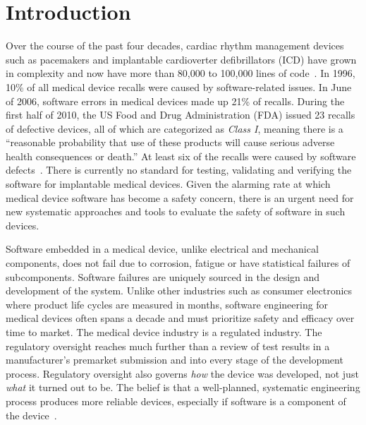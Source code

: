 \chapter{Introduction}
  Over the course of the past four decades, cardiac rhythm management devices such as pacemakers and implantable cardioverter defibrillators (ICD) have grown in complexity and now have more than 80,000 to 100,000 lines of code~\cite{pauljones}. In 1996, 10\% of all medical device recalls were caused by software-related issues. In June of 2006, software errors in medical devices made up 21\% of recalls. During the first half of 2010, the US Food and Drug Administration (FDA) issued 23 recalls of defective devices, all of which are categorized as \emph{Class I}, meaning there is a ``reasonable probability that use of these products will cause serious adverse health consequences or death.'' At least six of the recalls were  caused by software defects~\cite{recalls,killedbycode}. There is currently no standard for testing, validating and verifying the software for implantable medical devices. Given the alarming rate at which medical device software has become a safety concern, there is an urgent need for new systematic approaches and tools to evaluate the safety of software in such devices. 

Software embedded in a medical device, unlike electrical and mechanical components, does not fail due to corrosion, fatigue or have statistical failures of subcomponents. Software failures are uniquely sourced in the design and development of the system. Unlike other industries such as consumer electronics where product life cycles are measured in months, software engineering for medical devices often spans a decade and must prioritize safety and efficacy over time to market. The medical device industry is a regulated industry. The regulatory oversight reaches much further than a review of test results in a manufacturer's premarket submission and into every stage of the development process. Regulatory oversight also governs \emph{how} the device was developed, not just \emph{what} it turned out to be. The belief is that a well-planned, systematic engineering process produces more reliable devices, especially if software is a component of the device~\cite{med-book}.

